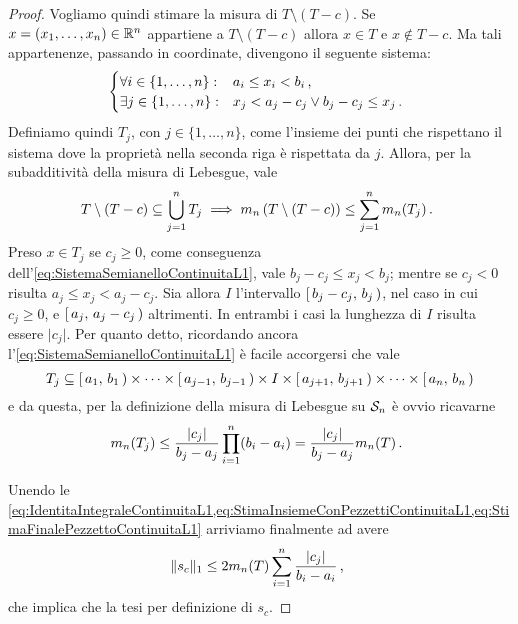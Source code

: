 \begin{proof}
	Vogliamo quindi stimare la misura di $T\setminus\left(T-c\right)$. 
	Se $x=(x_1,\dots,x_n)\in\R^n$ appartiene a $T\setminus\left(T-c\right)$ allora $x\in T$ e $x\not\in T-c$. Ma tali appartenenze, passando in coordinate, divengono il seguente sistema:
	\begin{equation}\label{eq:SistemaSemianelloContinuitaL1}
		\begin{cases}
			\forall i\in\{1,\dots,n\}: &a_i\le x_i<b_i \virgola\\
			\exists j\in\{1,\dots,n\}: &x_j<a_j-c_j \vee b_j-c_j\le x_j \punto
		\end{cases}
	\end{equation}
	Definiamo quindi $T_j$, con $j\in\{1,\dots,n\}$, come l'insieme dei punti che rispettano il sistema dove la proprietà nella seconda riga è rispettata da $j$.
	Allora, per la subadditività della misura di Lebesgue, vale
	\begin{equation}\label{eq:StimaInsiemeConPezzettiContinuitaL1}
		T\setminus\left(T-c\right)\subseteq \bigcup_{j=1}^n T_j \implies m_n\left(T\setminus\left(T-c\right)\right)\le \sum_{j=1}^n m_n(T_j) \punto
	\end{equation}
	Preso $x\in T_j$ se $c_j\ge 0$, come conseguenza dell'\cref{eq:SistemaSemianelloContinuitaL1}, vale $b_j-c_j\le x_j<b_j$; mentre se $c_j<0$ risulta $a_j\le x_j<a_j-c_j$. Sia allora $I$ l'intervallo $\co{b_j-c_j}{b_j}$, nel caso in cui $c_j\ge 0$, e $\co{a_j}{a_j-c_j}$ altrimenti. In entrambi i casi la lunghezza di $I$ risulta essere $\lvert c_j \rvert$.
	Per quanto detto, ricordando ancora l'\cref{eq:SistemaSemianelloContinuitaL1} è facile accorgersi che vale
	\begin{equation*}
		T_j\subseteq \co{a_1}{b_1}\times\cdots\times\co{a_{j-1}}{b_{j-1}}\times I\times\co{a_{j+1}}{b_{j+1}}\times\cdots\times \co{a_n}{b_n}
	\end{equation*}
	e da questa, per la definizione della misura di Lebesgue su $\S_n$ è ovvio ricavarne
	\begin{equation}\label{eq:StimaFinalePezzettoContinuitaL1}
		m_n(T_j)\le \frac{\lvert c_j\rvert }{b_j-a_j} \prod_{i=1}^n (b_i-a_i)=\frac{\lvert c_j\rvert }{b_j-a_j} m_n(T) \punto
	\end{equation}
	
	Unendo le \cref{eq:IdentitaIntegraleContinuitaL1,eq:StimaInsiemeConPezzettiContinuitaL1,eq:StimaFinalePezzettoContinuitaL1} arriviamo finalmente ad avere
	\begin{equation*}
		\LNorm{s_c}\le 2m_n(T)\sum_{i=1}^n \frac{\lvert c_j\rvert }{b_i-a_i}\virgola
	\end{equation*}
	che implica che la tesi per definizione di $s_c$.
\end{proof}



